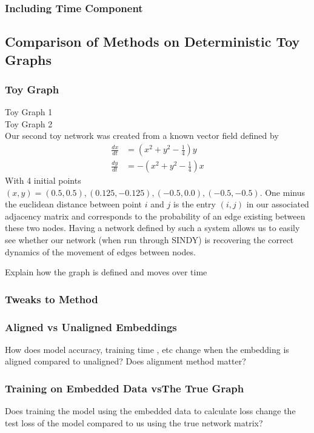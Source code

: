 \documentclass[12pt]{article}
\begin{document}
        \subsubsection{Including Time Component}
    \subsection{Comparison of Methods on Deterministic Toy Graphs}
        \subsubsection{Toy Graph}
            Toy Graph 1\\
            
            
            Toy Graph 2\\
                Our second toy network was created from a known vector field defined by
                \begin{align}
                    \frac{dx}{dt} &= (x^2+y^2-\frac14)y\\
                    \frac{dy}{dt} &= -(x^2+y^2-\frac14)x
                \end{align}
                With 4 initial points $(x,y)=(0.5,0.5), (0.125, -0.125), (-0.5, 0.0), (-0.5, -0.5)$. One minus the euclidean distance between point $i$ and $j$ is the entry $(i,j)$ in our associated adjacency matrix and corresponds to the probability of an edge existing between these two nodes. Having a network defined by such a system allows us to easily see whether our network (when run through SINDY) is recovering the correct dynamics of the movement of edges between nodes.

            
            
            
            
            
            Explain how the graph is defined and moves over time
        \subsubsection{Tweaks to Method}
            \subsubsection{Aligned vs Unaligned Embeddings}
                How does model accuracy, training time , etc change when the embedding is aligned compared to unaligned? Does alignment method matter?
            \subsubsection{Training on Embedded Data vsThe True Graph}
                Does training the model using the embedded data to calculate loss change the test loss of the model compared to us using the true network matrix?
\end{document}
